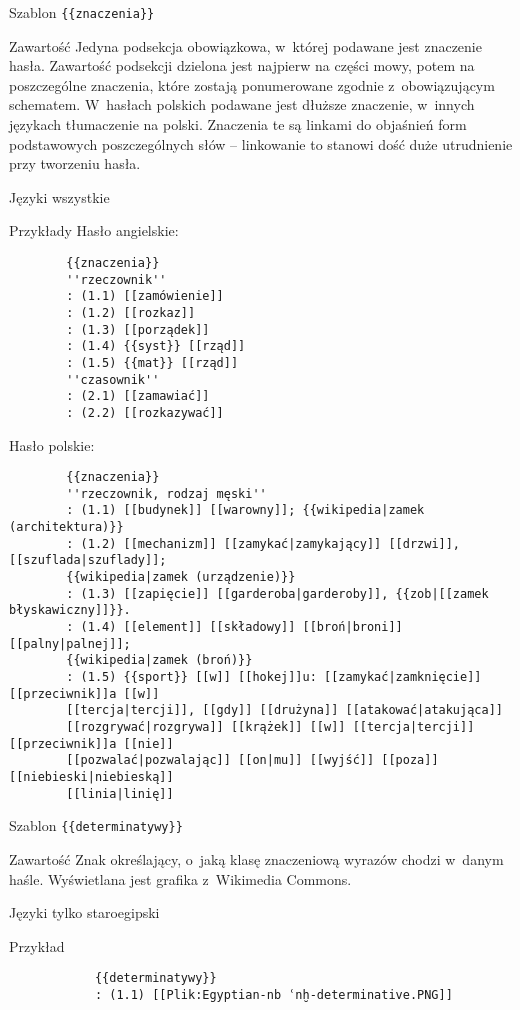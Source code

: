 \documentclass{pracamgr}
\begin{document}
\begin{opis}
	\item[Szablon] \verb|{{znaczenia}}|
	\item[Zawartość] Jedyna podsekcja obowiązkowa, w~której podawane jest znaczenie hasła. Zawartość podsekcji dzielona jest najpierw na części mowy, potem na poszczególne znaczenia, które zostają ponumerowane zgodnie z~obowiązującym schematem. W~hasłach polskich podawane jest dłuższe znaczenie, w~innych językach tłumaczenie na polski. Znaczenia te są linkami do objaśnień form podstawowych poszczególnych słów -- linkowanie to stanowi dość duże utrudnienie przy tworzeniu hasła.
	\item[Języki] wszystkie
	\item[Przykłady] Hasło angielskie:
		\begin{verbatim}
		{{znaczenia}}
		''rzeczownik''
		: (1.1) [[zamówienie]]
		: (1.2) [[rozkaz]]
		: (1.3) [[porządek]]
		: (1.4) {{syst}} [[rząd]]
		: (1.5) {{mat}} [[rząd]]
		''czasownik''
		: (2.1) [[zamawiać]]
		: (2.2) [[rozkazywać]]
		\end{verbatim}
		Hasło polskie:
		\begin{verbatim}
		{{znaczenia}}
		''rzeczownik, rodzaj męski''
		: (1.1) [[budynek]] [[warowny]]; {{wikipedia|zamek (architektura)}}
		: (1.2) [[mechanizm]] [[zamykać|zamykający]] [[drzwi]], [[szuflada|szuflady]];
		{{wikipedia|zamek (urządzenie)}}
		: (1.3) [[zapięcie]] [[garderoba|garderoby]], {{zob|[[zamek błyskawiczny]]}}.
		: (1.4) [[element]] [[składowy]] [[broń|broni]] [[palny|palnej]];
		{{wikipedia|zamek (broń)}}
		: (1.5) {{sport}} [[w]] [[hokej]]u: [[zamykać|zamknięcie]] [[przeciwnik]]a [[w]]
		[[tercja|tercji]], [[gdy]] [[drużyna]] [[atakować|atakująca]]
		[[rozgrywać|rozgrywa]] [[krążek]] [[w]] [[tercja|tercji]] [[przeciwnik]]a [[nie]]
		[[pozwalać|pozwalając]] [[on|mu]] [[wyjść]] [[poza]] [[niebieski|niebieską]]
		[[linia|linię]]
		\end{verbatim}
\end{opis}
\spacer
\begin{opis}
	\item[Szablon] \verb|{{determinatywy}}|
	\item[Zawartość] Znak określający, o~jaką klasę znaczeniową wyrazów chodzi w~danym haśle. Wyświetlana jest grafika z~Wikimedia Commons.
	\item[Języki] tylko staroegipski
	\item[Przykład]
		\begin{verbatim}
			{{determinatywy}}
			: (1.1) [[Plik:Egyptian-nb ʿnḫ-determinative.PNG]]
		\end{verbatim}
\end{opis}
\end{document}

